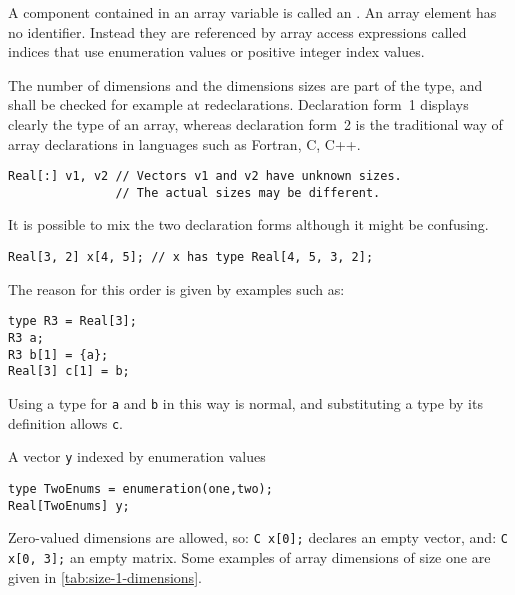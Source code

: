 A component contained in an array variable is called an .
An array element has no identifier.
Instead they are referenced by array access expressions called indices that use enumeration values or positive integer index values.

\begin{example}
The number of dimensions and the dimensions sizes are part of
the type, and shall be checked for example at redeclarations.
Declaration form~1 displays clearly the type of an array, whereas
declaration form~2 is the traditional way of array declarations in
languages such as Fortran, C, C++.

\begin{lstlisting}[language=modelica]
Real[:] v1, v2 // Vectors v1 and v2 have unknown sizes.
               // The actual sizes may be different.
\end{lstlisting}
It is possible to mix the two declaration forms although it might be confusing.
\begin{lstlisting}[language=modelica]
Real[3, 2] x[4, 5]; // x has type Real[4, 5, 3, 2];
\end{lstlisting}
The reason for this order is given by examples such as:
\begin{lstlisting}[language=modelica]
type R3 = Real[3];
R3 a;
R3 b[1] = {a};
Real[3] c[1] = b;
\end{lstlisting}
Using a type for \lstinline!a! and \lstinline!b! in this way is normal, and substituting a type by its definition allows \lstinline!c!.

A vector \lstinline!y! indexed by enumeration values
\begin{lstlisting}[language=modelica]
type TwoEnums = enumeration(one,two);
Real[TwoEnums] y;
\end{lstlisting}
\end{example}

Zero-valued dimensions are allowed, so: \lstinline!C x[0];! declares an empty vector, and: \lstinline!C x[0, 3];! an empty matrix.  Some examples of array dimensions of size one are given in \cref{tab:size-1-dimensions}.

